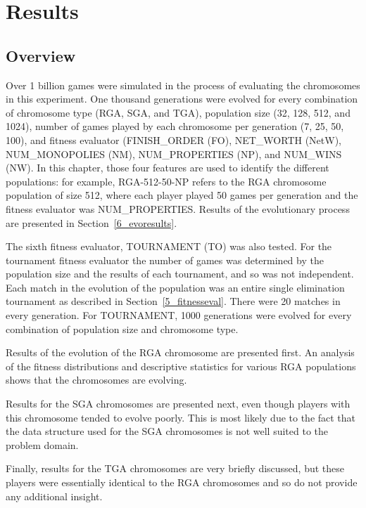 \clearpage
\chapter{Results}\label{chap:results}

\section{Overview}

Over 1 billion games were simulated in the process of evaluating the chromosomes
in this experiment. One thousand generations were evolved for every combination
of chromosome type (RGA, SGA, and TGA), population size (32, 128, 512, and
1024), number of games played by each chromosome per generation (7, 25, 50,
100), and fitness evaluator (FINISH\_ORDER (FO), NET\_WORTH (NetW),
NUM\_MONOPOLIES (NM), NUM\_PROPERTIES (NP), and NUM\_WINS (NW). In this chapter,
those four features are used to identify the different populations: for example,
RGA-512-50-NP refers to the RGA chromosome population of size 512, where each
player played 50 games per generation and the fitness evaluator was
NUM\_PROPERTIES. Results of the evolutionary process are presented in
Section~\ref{6_evoresults}.

The sixth fitness evaluator, TOURNAMENT (TO) was also tested. For the tournament
fitness evaluator the number of games was determined by the population size and
the results of each tournament, and so was not independent. Each match in the
evolution of the population was an entire single elimination tournament as
described in Section~\ref{5_fitnesseval}. There were 20 matches in every
generation. For TOURNAMENT, 1000 generations were evolved for every combination
of population size and chromosome type.

Results of the evolution of the RGA chromosome are presented first. An analysis
of the fitness distributions and descriptive statistics for various RGA
populations shows that the chromosomes are evolving.

Results for the SGA chromosomes are presented next, even though players with
this chromosome tended to evolve poorly. This is most likely due to the fact
that the data structure used for the SGA chromosomes is not well suited to the
problem domain.

Finally, results for the TGA chromosomes are very briefly discussed, but these
players were essentially identical to the RGA chromosomes and so do not provide
any additional insight.

